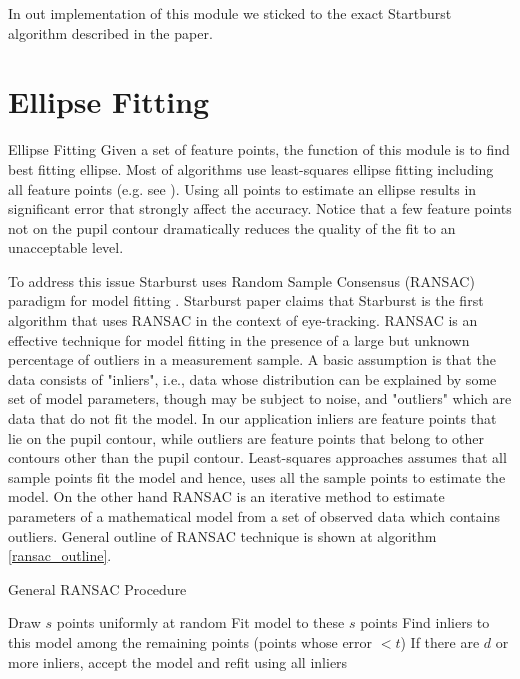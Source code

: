 \documentclass[12pt,fleqn]{book} %
\begin{document}
In out implementation of this module we sticked to the exact Startburst algorithm described in the paper.



\section{Ellipse Fitting}{Ellipse Fitting}
Given a set of feature points, the function of this module is to find best fitting ellipse.  Most of algorithms use least-squares ellipse fitting including all feature points (e.g. see \cite{least_squares}). Using all points to estimate an ellipse results in significant error that strongly affect the accuracy. Notice that a few feature points not on the pupil contour dramatically reduces the quality of the fit to an unacceptable level.  \bigskip

To address this issue Starburst uses Random Sample Consensus (RANSAC) paradigm for model fitting \cite{ransac}. Starburst paper claims that Starburst is the first algorithm that uses RANSAC in the context of eye-tracking. RANSAC is an effective technique for model fitting in the presence of a large but unknown percentage of outliers in a measurement sample. A basic assumption is that the data  consists of "inliers", i.e., data whose distribution can be explained by some set of model parameters, though may be subject to noise, and "outliers" which are data that do not fit the model. In our application inliers are feature points that lie on the pupil contour, while outliers are feature points that belong to other contours other than the pupil contour. Least-squares approaches assumes that all sample points fit the model and hence, uses all the sample points to estimate the model. On the other hand RANSAC is an iterative method to estimate parameters of a mathematical model from a set of observed data which contains outliers. General outline of RANSAC technique is shown at algorithm \ref{ransac_outline}. \bigskip

\begin{algorithm}
\begin{dBox}
	\caption{General RANSAC Procedure} \label{ransac_outline}
	\begin{algorithmic}[1]
			\State Draw $s$ points uniformly at random
			\State Fit model to these $s$ points
			\State Find inliers to this model among the remaining points (points whose error $ < t$)
			\State If there are $d$ or more inliers, accept the model and refit using all inliers	
		\EndWhile	
		\EndProcedure	
	\end{algorithmic}
\end{dBox}	
\end{algorithm}
\end{document}
